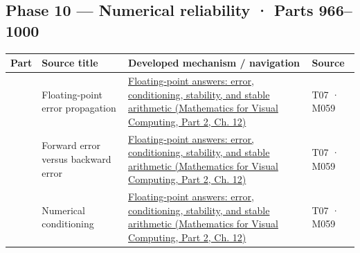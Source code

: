 \subsection{Phase 10 --- Numerical reliability · Parts 966--1000}\label{appendix-fd090d982a15-phase-10-numerical-reliability-parts-9661000}

\hypertarget{appendix-fd090d982a15-phase-10-numerical-reliability-parts-9661000}{}

{\def\LTcaptype{none} %
\begin{longtable}[]{@{}
  >{\raggedleft\arraybackslash}p{}
  >{\raggedright\arraybackslash}p{}
  >{\raggedright\arraybackslash}p{}
  >{\raggedright\arraybackslash}p{}@{}}
\toprule\noalign{}
\begin{minipage}[b]{\linewidth}\raggedleft
Part
\end{minipage} & \begin{minipage}[b]{\linewidth}\raggedright
Source title
\end{minipage} & \begin{minipage}[b]{\linewidth}\raggedright
Developed mechanism / navigation
\end{minipage} & \begin{minipage}[b]{\linewidth}\raggedright
Source
\end{minipage} \\
\midrule\noalign{}
\endhead
\bottomrule\noalign{}
\endlastfoot
966 & Floating-point error propagation & \href{../02-Mathematics-for-Visual-Computing-P02/main.pdf\#02-foundations-ii-ch028-floating-point-answers-error-conditioning-stability-and-stable-arithmetic}{Floating-point answers: error, conditioning, stability, and stable arithmetic (Mathematics for Visual Computing, Part 2, Ch. 12)} & T07 · M059 \\
967 & Forward error versus backward error & \href{../02-Mathematics-for-Visual-Computing-P02/main.pdf\#02-foundations-ii-ch028-floating-point-answers-error-conditioning-stability-and-stable-arithmetic}{Floating-point answers: error, conditioning, stability, and stable arithmetic (Mathematics for Visual Computing, Part 2, Ch. 12)} & T07 · M059 \\
968 & Numerical conditioning & \href{../02-Mathematics-for-Visual-Computing-P02/main.pdf\#02-foundations-ii-ch028-floating-point-answers-error-conditioning-stability-and-stable-arithmetic}{Floating-point answers: error, conditioning, stability, and stable arithmetic (Mathematics for Visual Computing, Part 2, Ch. 12)} & T07 · M059 \\

\end{longtable}}
